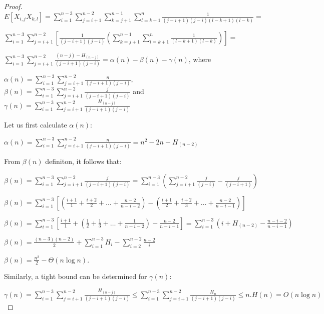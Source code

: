 \documentclass[12pt]{article}
\begin{document}
\begin{proof}
$E[X_{i,j} X_{k,l}] = \sum\limits_{i=1}^{n-3} \sum\limits_{j=i+1}^{n-2}
\sum\limits_{k=j+1}^{n-1} \sum\limits_{l=k+1}^{n} \frac{1}{(j-i+1)(j-i)(l-k+1)(l-k)} = $

$\sum\limits_{i=1}^{n-3} \sum\limits_{j=i+1}^{n-2}  \left[ \frac{1}{(j-i+1)(j-i)}
\left( \sum\limits_{k=j+1}^{n-1} \sum\limits_{l=k+1}^{n} \frac{1}{(l-k+1)(l-k)} \right) \right] =  $

$\sum\limits_{i=1}^{n-3} \sum\limits_{j=i+1}^{n-2} \frac{(n - j) - H_{(n - j)}} {(j-i+1)(j-i)} 
= \alpha(n) - \beta(n) - \gamma(n)$, where

$\alpha(n) = \sum\limits_{i=1}^{n-3} \sum\limits_{j=i+1}^{n-2} \frac{n} {(j-i+1)(j-i)}$,
$\beta(n) = \sum\limits_{i=1}^{n-3} \sum\limits_{j=i+1}^{n-2} \frac{j} {(j-i+1)(j-i)}$ and 
$\gamma(n) =  \sum\limits_{i=1}^{n-3} \sum\limits_{j=i+1}^{n-2} \frac{H_{(n - j)}} {(j-i+1)(j-i)}$

Let us first calculate $\alpha(n)$:

$\alpha(n) = \sum\limits_{i=1}^{n-3} \sum\limits_{j=i+1}^{n-2} \frac{n} {(j-i+1)(j-i)}
= n^2 - 2n - H_{(n-2)}$

From $\beta(n)$ definiton, it follows that:

$\beta(n) = \sum\limits_{i=1}^{n-3} \sum\limits_{j=i+1}^{n-2} \frac{j} {(j-i+1)(j-i)}
= \sum\limits_{i=1}^{n-3} \left( \sum\limits_{j=i+1}^{n-2} \frac{j}{(j-i)} - \frac{j} {(j-i+1)} \right)$

$\beta(n) = \sum\limits_{i=1}^{n-3} \left[ \left( \frac{i+1}{1} +  \frac{i+2}{2} + \ldots + \frac{n-2}{n-i-2} \right)
- \left( \frac{i+1}{2} +  \frac{i+2}{3} + \ldots + \frac{n-2}{n-i-1} \right) \right]$

$\beta(n) = \sum\limits_{i=1}^{n-3} \left[
\frac{i+1}{1}  + \left( \frac{1}{2} +  \frac{1}{3} + \ldots + \frac{1}{n-i-2} \right)
- \frac{n-2}{n-i-1} \right]
= \sum\limits_{i=1}^{n-3} \left( i + H_{(n-2)} - \frac{n-i-2}{n-i-1} \right)$

$\beta(n) = \frac{(n-3)(n-2)}{2} + \sum\limits_{i=1}^{n-3} H_{i} - \sum\limits_{i=2}^{n-2} \frac{n-2}{i}$

$\beta(n) = \frac{n^2}{2} - \Theta(n \log n)$.

Similarly, a tight bound can be determined for $\gamma(n)$:

$\gamma(n) =  \sum\limits_{i=1}^{n-3} \sum\limits_{j=i+1}^{n-2} \frac{H_{(n - j)}} {(j-i+1)(j-i)}
\leq  \sum\limits_{i=1}^{n-3} \sum\limits_{j=i+1}^{n-2} \frac{H_{n}} {(j-i+1)(j-i)}
\leq  n . H(n) = O(n \log n) $


\end{proof}
\end{document}
